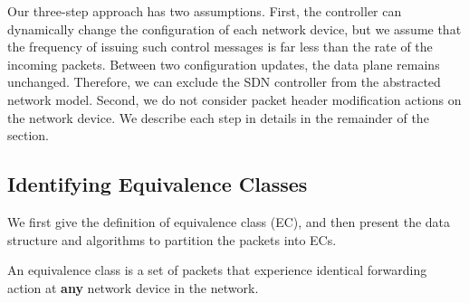 Our three-step approach has two assumptions. First, the controller can dynamically change the configuration of each network device, but we assume that the frequency of issuing such control messages is far less than the rate of the incoming packets. Between two configuration updates, the data plane remains unchanged. Therefore, we can exclude the SDN controller from the abstracted network model. Second, we do not consider packet header modification actions on the network device. We describe each step in details in the remainder of the section.


\subsection{Identifying Equivalence Classes}
\label{ec}

We first give the definition of equivalence class (EC), and then present the data structure and algorithms to partition the packets into ECs.

\begin{definition}
An equivalence class is a set of packets that experience identical forwarding action at \textbf{any} network device in the network.
\label{Def:EC}
\end{definition}


